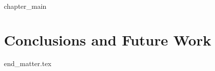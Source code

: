 \documentclass[print]{dissertation}
\begin{document}



\ifchapeight
    {chapter_main}
\else
    \chapter{Conclusions and Future Work}
    \label{chapter:conclusions}
\fi
 

\thumbfalse
\FloatBarrier

{end_matter.tex}
\end{document}
